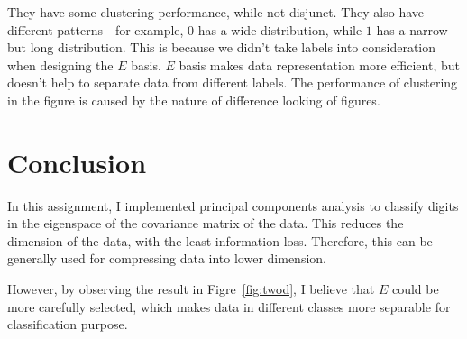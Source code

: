 \documentclass[10pt]{article}
\begin{document}
They have some clustering performance, while not disjunct. They also
have different patterns - for example, $0$ has a wide distribution,
while $1$ has a narrow but long distribution. This is because we
didn't take labels into consideration when designing the $E$ basis.
$E$ basis makes data representation more efficient, but doesn't help
to separate data from different labels. The performance of clustering
in the figure is caused by the nature of difference looking of
figures.

\section{Conclusion}

In this assignment, I implemented principal components analysis to
classify digits in the eigenspace of the covariance matrix of the
data. This reduces the dimension of the data, with the least
information loss. Therefore, this can be generally used for
compressing data into lower dimension.

However, by observing the result in Figre~\ref{fig:twod}, I believe
that $E$ could be more carefully selected, which makes data in
different classes more separable for classification purpose.
\end{document}
